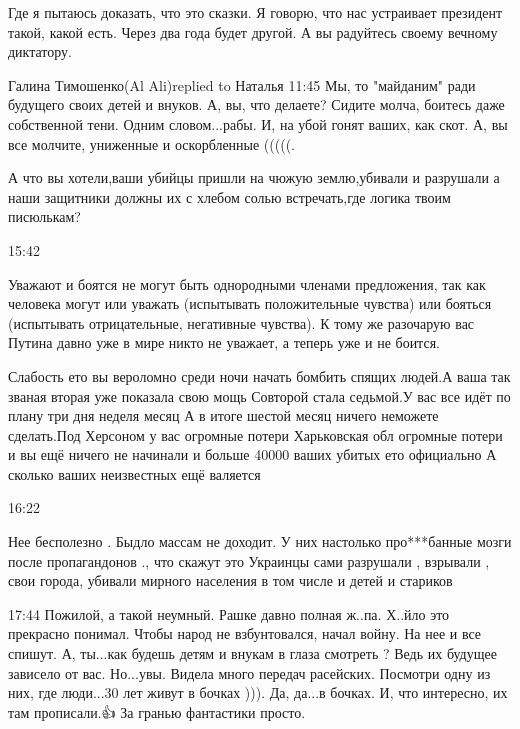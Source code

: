 {%

Где я пытаюсь доказать, что это сказки. Я говорю, что нас устраивает президент
такой, какой есть. Через два года будет другой. А вы радуйтесь своему вечному
диктатору.

Галина Тимошенко(Al Ali)replied to Наталья
11:45
Мы, то  "майданим" ради будущего своих детей и внуков. А, вы, что делаете?
Сидите молча, боитесь даже собственной тени.
Одним словом...рабы.
И, на убой гонят ваших, как скот. А, вы все молчите, униженные и оскорбленные (((((.


А что вы хотели,ваши убийцы пришли на чюжую землю,убивали и разрушали а наши
защитники должны их с хлебом солью встречать,где логика твоим писюлькам?

15:42

Уважают и боятся не могут быть однородными членами предложения, так как
человека могут или уважать (испытывать положительные чувства) или бояться
(испытывать отрицательные, негативные чувства). К тому же разочарую вас Путина
давно уже в мире никто не уважает, а теперь уже и не боится.


Слабость ето вы вероломно среди ночи начать бомбить спящих людей.А ваша так
званая вторая уже показала свою мощь Совторой стала седьмой.У вас все идёт по
плану три дня неделя месяц А в итоге шестой месяц ничего неможете сделать.Под
Херсоном у вас огромные потери Харьковская обл огромные потери и вы ещё ничего
не начинали и больше 40000 ваших убитых ето официально А сколько ваших
неизвестных ещё валяется

16:22

Нее бесполезно . Быдло массам не доходит. У них настолько про***банные мозги
после пропагандонов ., что скажут это Украинцы сами разрушали , взрывали , свои
города, убивали мирного населения в том числе  и детей и стариков

17:44
Пожилой, а такой неумный.
Рашке давно полная ж..па.
Х..йло это прекрасно понимал. Чтобы народ не взбунтовался, начал войну.
На нее и все спишут.
А, ты...как будешь детям и внукам в глаза смотреть ?
Ведь их будущее зависело от вас. Но...увы.
Видела много передач расейских. Посмотри одну из них, где люди...30 лет живут в бочках ))). Да, да...в бочках. И, что интересно, их там прописали.👍
За гранью фантастики просто.

}
